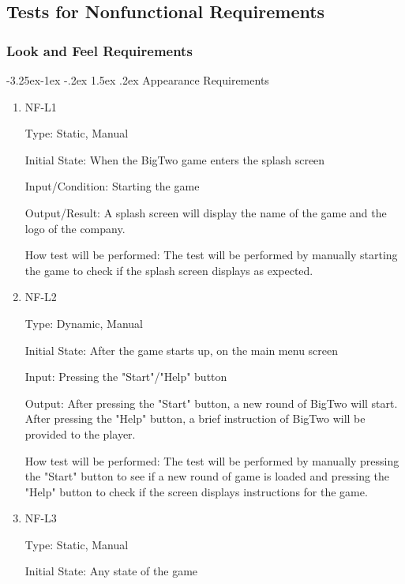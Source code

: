 \documentclass[12pt, titlepage]{article}
\makeatletter
\renewcommand\paragraph{\@startsection{paragraph}{4}{\z@}%
                                     {-3.25ex\@plus -1ex \@minus -.2ex}%
                                     {1.5ex \@plus .2ex}%
                                     {\normalfont\normalsize\bfseries}}
\makeatother
\begin{document}
\subsection{Tests for Nonfunctional Requirements}
\subsubsection{Look and Feel Requirements}
\paragraph{Appearance Requirements}
\begin{enumerate}

\item{NF-L1\\}

Type: Static, Manual
					
Initial State: When the BigTwo game enters the splash screen
					
Input/Condition: Starting the game
					
Output/Result: A splash screen will display the name of the game and the logo of the company.
					
How test will be performed: The test will be performed by manually starting the game to check if the splash screen displays as expected. 

\item{NF-L2\\}

Type: Dynamic, Manual
					
Initial State: After the game starts up, on the main menu screen
					
Input: Pressing the "Start"/"Help" button
					
Output: After pressing the "Start" button, a new round of BigTwo will start.\\
After pressing the "Help" button, a brief instruction of BigTwo will be provided to the player.
					
How test will be performed: The test will be performed by manually pressing the "Start" button to see if a new round of game is loaded and pressing the "Help" button to check if the screen displays instructions for the game. 
					
\item{NF-L3\\}

Type: Static, Manual
					
Initial State: Any state of the game
					

\end{enumerate}
\end{document}
